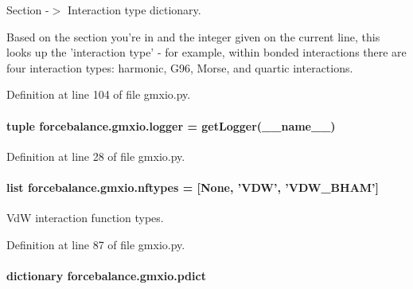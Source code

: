 Section -\/$>$ Interaction type dictionary. 

Based on the section you're in and the integer given on the current line, this looks up the 'interaction type' -\/ for example, within bonded interactions there are four interaction types\-: harmonic, G96, Morse, and quartic interactions. 

Definition at line 104 of file gmxio.\-py.

\hypertarget{namespaceforcebalance_1_1gmxio_ac10457054444ca04e0a265665afc2512}{
\paragraph[{logger}]{\setlength{\rightskip}{0pt plus 5cm}tuple forcebalance.\-gmxio.\-logger = get\-Logger(\-\_\-\-\_\-name\-\_\-\-\_\-)}}\label{namespaceforcebalance_1_1gmxio_ac10457054444ca04e0a265665afc2512}


Definition at line 28 of file gmxio.\-py.

\hypertarget{namespaceforcebalance_1_1gmxio_a337bc61280b58a43319380dec9c5529a}{
\paragraph[{nftypes}]{\setlength{\rightskip}{0pt plus 5cm}list forcebalance.\-gmxio.\-nftypes = \mbox{[}None, 'V\-D\-W', 'V\-D\-W\-\_\-\-B\-H\-A\-M'\mbox{]}}}\label{namespaceforcebalance_1_1gmxio_a337bc61280b58a43319380dec9c5529a}


Vd\-W interaction function types. 



Definition at line 87 of file gmxio.\-py.

\hypertarget{namespaceforcebalance_1_1gmxio_ae845e0b923ecde16c79f2742b94534a6}{
\paragraph[{pdict}]{\setlength{\rightskip}{0pt plus 5cm}dictionary forcebalance.\-gmxio.\-pdict}}\label{namespaceforcebalance_1_1gmxio_ae845e0b923ecde16c79f2742b94534a6}


